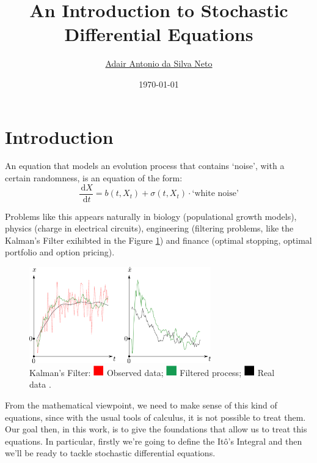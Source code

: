 \documentclass[12pt,a4paper]{article}
\author{\sffamily \href{https://github.com/adairneto}{Adair Antonio da Silva Neto}}
\title{\sffamily An Introduction to Stochastic Differential Equations}
\date{\sffamily \today}
\newcommand\crule[3][black]{\textcolor{#1}{\rule{#2}{#3}}}
\theoremstyle{definition}
\begin{document}
\clearpage\maketitle
\thispagestyle{empty}

\newpage

\tableofcontents

\newpage
\clearpage
\setcounter{page}{1}

\section{Introduction}


An equation that models an evolution process that contains `noise', with a certain randomness, is an equation of the form:
\begin{equation}\label{eq:sde}
	\frac{\, \mathrm{d}X}{\, \mathrm{d}t} = b(t,X_t) + \sigma(t,X_t)\cdot \text{`white noise'}
\end{equation}

Problems like this appears naturally in biology (populational growth models), physics (charge in electrical circuits), engineering (filtering problems, like the Kalman's Filter exihibted in the Figure \ref{fig:kalman}) and finance (optimal stopping, optimal portfolio and option pricing).

\begin{figure}[H]
  \centering
    \includegraphics[width=0.7\textwidth]{Kalman.png} 
    \caption{Kalman's Filter: $\crule[red]{0.4cm}{0.4cm}$ Observed data; $\crule[ForestGreen]{0.4cm}{0.4cm}$ Filtered process; $\crule{0.4cm}{0.4cm}$ Real data \cite{wiki:Kalman_filter}.}
    \label{fig:kalman}
\end{figure}

From the mathematical viewpoint, we need to make sense of this kind of equations, since with the usual tools of calculus, it is not possible to treat them. Our goal then, in this work, is to give the foundations that allow us to treat this equations. In particular, firstly we're going to define the Itô's Integral and then we'll be ready to tackle stochastic differential equations.
\end{document}
